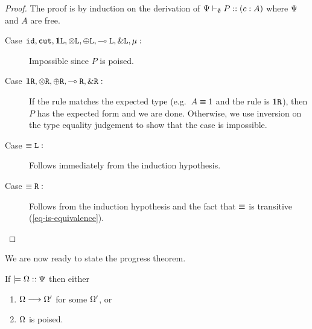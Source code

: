 \begin{proof}
  The proof is by induction on the derivation of ${\Psi} \vdash_{\emptyset} P :: (c : A)$ where $\Psi$ and $A$ are free.

  \begin{description}
    \item[Case $\texttt{id}, \texttt{cut}, \mathbf{1}\texttt{L}, \otimes\texttt{L}, \oplus\texttt{L}, \multimap\texttt{L}, \&\texttt{L}, \mu :$] Impossible since $P$ is poised.

    \item[Case $\mathbf{1}\texttt{R}, \otimes\texttt{R}, \oplus\texttt{R}, \multimap\texttt{R}, \&\texttt{R} :$] If the rule matches the expected type (e.g.\ $A \equiv 1$ and the rule is $\mathbf{1}\texttt{R}$), then $P$ has the expected form and we are done. Otherwise, we use inversion on the type equality judgement to show that the case is impossible.

    \item[Case $\equiv\texttt{L} :$] Follows immediately from the induction hypothesis.

    \item[Case $\equiv\texttt{R} :$] Follows from the induction hypothesis and the fact that $\equiv$ is transitive (\cref{eq-is-equivalence}).
  \end{description}
\end{proof}

We are now ready to state the progress theorem.

\begin{theorem}[Progress]
\label{base:progress}
If $\models {\Omega} :: {\Psi}$ then either
\begin{enumerate}
  \item $\Omega \longrightarrow \Omega'$ for some $\Omega'$, or
  \item $\Omega$ is poised.
\end{enumerate}
\end{theorem}

